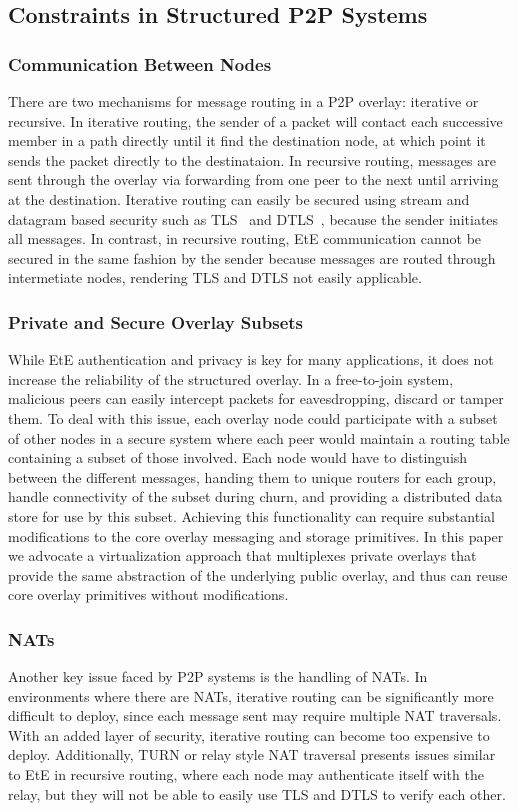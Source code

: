 \documentclass[conference]{IEEEtran}
\begin{document}
\subsection{Constraints in Structured P2P Systems}
\subsubsection{Communication Between Nodes}
There are two mechanisms for message routing in a P2P overlay: iterative or
recursive.  In iterative routing, the sender of a packet will contact each
successive member in a path directly until it find the destination node, at
which point it sends the packet directly to the destinataion.  In recursive
routing, messages are sent through the overlay via forwarding from one peer to
the next until arriving at the destination.  Iterative routing can easily be
secured using stream and datagram based security such as TLS~\cite{tls} and
DTLS~\cite{dtls}, because the sender initiates all messages.  In contrast, in recursive routing, 
EtE communication cannot be secured in the same fashion by the sender because 
messages are routed through intermetiate nodes, rendering TLS and DTLS not
easily applicable.

\subsubsection{Private and Secure Overlay Subsets}
While EtE authentication and privacy is key for many applications, it does not increase the reliability of the structured
overlay.  In a free-to-join system, malicious peers can easily intercept packets
for eavesdropping, discard or tamper them.  To deal with
this issue, each overlay node could participate with a subset of other nodes in
a secure system where each peer would maintain a routing table containing a subset
of those involved.  Each node would have to distinguish between the different
messages, handing them to unique routers for each group, handle connectivity
of the subset during churn, and providing a distributed data store for use by this subset.
Achieving this functionality can require substantial modifications to the core overlay
messaging and storage primitives. In this paper we advocate a virtualization approach
that multiplexes private overlays that provide the same abstraction of the underlying
public overlay, and thus can reuse core overlay primitives without modifications.

\subsubsection{NATs}
Another key issue faced by P2P systems is the handling of NATs.  In environments
where there are NATs, iterative routing can be significantly more difficult to
deploy, since each message sent may require multiple NAT traversals.  With an
added layer of security, iterative routing can become too expensive to
deploy.   Additionally, TURN or relay style NAT traversal presents issues
similar to EtE in recursive routing, where each node may authenticate
itself with the relay, but they will not be able to easily use TLS and DTLS to
verify each other.
\end{document}
